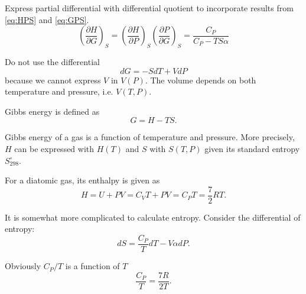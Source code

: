 \begin{@empty}
\begin{answer}
    Express partial differential with differential quotient to incorporate
    results from \eqref{eq:HPS} and \eqref{eq:GPS}.
    \[
        \left( \frac{\partial H}{\partial G} \right)_S
        = \left( \frac{\partial H}{\partial P} \right)_S \left( \frac{\partial P}{\partial G} \right)_S
        = \frac{C_P}{C_P - TS\alpha}
    \]
\end{answer}

\begin{problem}
\end{problem}

\begin{problem}
\end{problem}

\begin{problem}
\end{problem}

\begin{problem}
\end{problem}

\begin{problem}
\end{problem}

\begin{remark}
    Do not use the differential
    \[ dG = -SdT + VdP \]
    because we cannot express $V$ in $V(P)$.  The volume depends on both
    temperature and pressure, i.e. $V(T, P)$.
\end{remark}

\begin{answer}
    Gibbs energy is defined as
    \begin{equation}
        G = H - TS. \label{eq:4.14.G}
    \end{equation}

    Gibbs energy of a gas is a function of temperature and pressure.  More
    precisely, $H$ can be expressed with $H(T)$ and $S$ with $S(T, P)$ given
    its standard entropy $S_{298}^\circ$.

    For a diatomic gas, its enthalpy is given as
    \begin{equation}
        H = U + PV = C_V T + PV = C_P T = \frac72 RT. \label{eq:4.14.H}
    \end{equation}

    It is somewhat more complicated to calculate entropy.  Consider the
    differential of entropy:
    \[ dS = \frac{C_P}{T} dT - V\alpha dP.\]

    Obviously $C_P / T$ is a function of $T$
    \[ \frac{C_P}{T} = \frac{7R}{2T}.\]


\end{answer}
\end{@empty}
